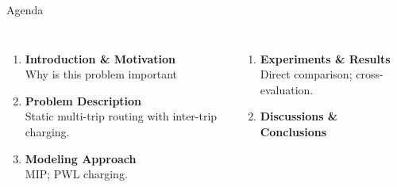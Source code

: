 \documentclass[10pt,aspectratio=169]{beamer}
\begin{document}
\begin{frame}{Agenda}
\vspace{6pt}
\begin{columns}[T,onlytextwidth]
\begin{enumerate}\itemsep5pt
  \item \textbf{Introduction \& Motivation} \\
        {\small\color{PurdueGray} Why is this problem important}
  \item \textbf{Problem Description} \\
        {\small\color{PurdueGray} Static multi-trip routing with inter-trip charging.}
  \item \textbf{Modeling Approach} \\
        {\small\color{PurdueGray} MIP; PWL charging.}
\end{enumerate}
\begin{enumerate}\itemsep5pt
  \setcounter{enumi}{3}
  \item \textbf{Experiments \& Results} \\
        {\small\color{PurdueGray} Direct comparison; cross-evaluation.}
  \item \textbf{Discussions \& Conclusions} \\
\end{enumerate}
\end{columns}
\end{frame}

\end{document}
